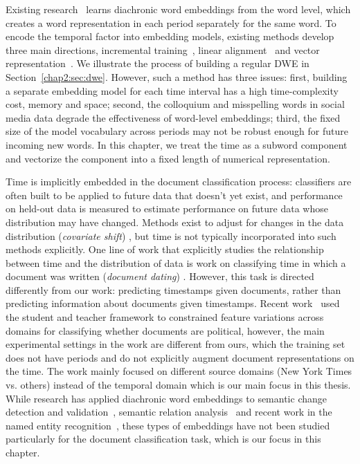 Existing research~\cite{kim2014temporal, hamilton2016diachronic, yao2018dynamic, kutuzov2018diachronic} learns diachronic word embeddings from the word level, which creates a word representation in each period separately for the same word.
To encode the temporal factor into embedding models, existing methods develop three main directions, incremental training~\cite{kim2014temporal}, linear alignment~\cite{kulkarni2015statistically, hamilton2016diachronic} and vector representation~\cite{rosenfeld2018deep, huang2019neural}.
We illustrate the process of building a regular DWE in Section~\ref{chap2:sec:dwe}.
However, such a method has three issues: first, building a separate embedding model for each time interval has a high time-complexity cost, memory and space; second, the colloquium and misspelling words in social media data degrade the effectiveness of word-level embeddings; third, the fixed size of the model vocabulary across periods may not be robust enough for future incoming new words.
In this chapter, we treat the time as a subword component and vectorize the component into a fixed length of numerical representation.


Time is implicitly embedded in the document classification process: 
classifiers are often built to be applied to future data that doesn't yet exist,
and performance on held-out data is measured to estimate performance on future data whose distribution may have changed.
Methods exist to adjust for changes in the data distribution ({\em covariate shift}) \cite{shimodaira2000improving, bickel2009discriminative},
but time is not typically incorporated into such methods explicitly.
One line of work that explicitly studies the relationship between time and the distribution of data is work on classifying time in which a document was written ({\em document dating}) \cite{kanhabua2008improving, chambers2012labeling, kotsakos2014burstines}.
However, this task is directed differently from our work: predicting timestamps given documents, rather than predicting information about documents given timestamps.
Recent work~\cite{desai2019adaptive} used the student and teacher framework to constrained feature variations across domains for classifying whether documents are political, however, the main experimental settings in the work are different from ours, which the training set does not have periods and do not explicitly augment document representations on the time. 
The work mainly focused on different source domains (New York Times vs. others) instead of the temporal domain which is our main focus in this thesis.
While research has applied diachronic word embeddings to semantic change detection and validation~\cite{mihalcea2012word, kim2014temporal, kulkarni2015statistically, hamilton2016diachronic, dubossarsky2017outta, yao2018dynamic, rudolph2018dynamic, rosenfeld2018deep, hu2019diachronic}, semantic relation analysis~\cite{liao2016analysing, szymanski2017temporal, rosin2017learning} and recent work in the named entity recognition~\cite{rijhwani2020temporally}, these types of embeddings have not been studied particularly for the document classification task, which is our focus in this chapter.


